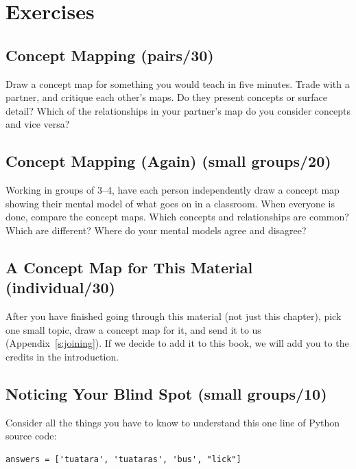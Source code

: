 \section{Exercises}\label{s:memory-exercises}

\subsection{Concept Mapping (pairs/30)}\label{concept-mapping-pairs30}

Draw a concept map for something you would teach in five minutes. Trade
with a partner, and critique each other's maps. Do they present concepts
or surface detail? Which of the relationships in your partner's map do
you consider concepts and vice versa?

\subsection{Concept Mapping (Again) (small groups/20)}\label{concept-mapping-again-small-groups20}

Working in groups of 3--4, have each person independently draw a concept
map showing their mental model of what goes on in a classroom. When
everyone is done, compare the concept maps. Which concepts and
relationships are common? Which are different? Where do your mental
models agree and disagree?

\subsection{A Concept Map for This Material (individual/30)}\label{a-concept-map-for-this-material-individual30}

After you have finished going through this material (not just this
chapter), pick one small topic, draw a concept map for it, and send it
to us (Appendix~\ref{s:joining}). If we decide to add it to this book, we
will add you to the credits in the introduction.

\subsection{Noticing Your Blind Spot (small groups/10)}\label{noticing-your-blind-spot-small-groups10}

Consider all the things you have to know to understand this one line of
Python source code:

\begin{verbatim}
answers = ['tuatara', 'tuataras', 'bus', "lick"]
\end{verbatim}

